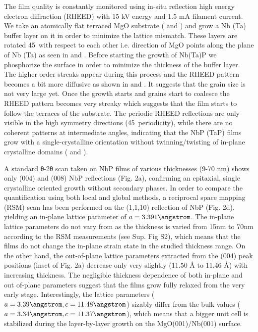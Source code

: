 The film quality is constantly monitored using in-situ reflection high energy electron diffraction 
(RHEED) with 15 kV energy and 1.5 mA filament current. We take an atomically flat terraced MgO 
substrate ( and ) and grow a Nb (Ta) buffer layer on it 
in order to minimize the lattice mismatch. These layers are rotated 45\degree\ with respect to 
each other i.e.  direction of MgO points along the  plane of Nb (Ta) 
as seen in  and . Before starting the growth of Nb(Ta)P 
we phosphorize the surface in order to minimize the thickness of the buffer layer. The higher 
order streaks appear during this process and the RHEED pattern becomes a bit more diffusive as 
shown in  and . It suggests that the grain 
size is not very large yet. Once the growth starts and grains start to coalesce the RHEED pattern 
becomes very streaky which suggests that the film starts to follow the terraces of the substrate. 
The periodic RHEED reflections are only visible in the high symmetry directions (45\degree\ 
periodicity), while there are no coherent patterns at intermediate angles, indicating that the 
NbP (TaP) films grow with a single-crystalline orientation without twinning/twisting of in-plane 
crystalline domains (\tref{rheed-NbP-100} and \tref{rheed-NbP-110}).

A standard θ-2θ scan taken on NbP films of various thicknesses (9-70 nm) shows only 
(004) and (008) NbP reflections (Fig. 2a), confirming an epitaxial, single crystalline 
oriented growth without secondary phases. In order to compare the quantification using 
both local and global methods, a reciprocal space mapping (RSM) scan has been performed 
on the (1,1,10) reflection of NbP (Fig. 2d), yielding an in-plane lattice parameter of 
$a=3.391 \angstrom$. The in-plane lattice parameters do not vary from as the thickness 
is varied from 15nm to 70nm according to the RSM measurements (see Sup. Fig S2), which 
means that the films do not change the in-plane strain state in the studied thickness range.
On the other hand, the out-of-plane lattice parameters extracted from the (004) peak positions
(inset of Fig. 2a) decrease only very slightly (11.50 Å to 11.46 Å) with increasing thickness.
The negligible thickness dependence of both in-plane and out of-plane parameters suggest that 
the films grow fully relaxed from the very early stage. Interestingly, the lattice parameters 
($a=3.39 \angstrom, c=11.48 \angstrom$) sizably differ from the bulk values 
($a=3.34 \angstrom, c=11.37 \angstrom$), which means that a bigger unit cell is stabilized 
during the layer-by-layer growth on the MgO(001)/Nb(001) surface.




